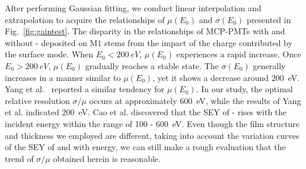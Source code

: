 After performing Gaussian fitting, we conduct linear interpolation and extrapolation to acquire the relationships of $\mu(E_0)$ and $\sigma(E_0)$ presented in Fig.~\ref{fig:gaintest}. The disparity in the relationships of MCP-PMTs with and without - deposited on $\mathrm{M}1$ stems from the impact of the charge contributed by the surface mode. When \(E_0 < \SI{200}{eV}\), $\mu(E_0)$ experiences a rapid increase. Once \(E_0 > \SI{200}{eV}\), $\mu(E_0)$ gradually reaches a stable state. The $\sigma(E_0)$ generally increases in a manner similar to $\mu(E_0)$, yet it shows a decrease around \SI{200}{eV}. Yang et al.~\cite{2017MCP} reported a similar tendency for $\mu(E_0)$. In our study, the optimal relative resolution $\sigma/\mu$ occurs at approximately \SI{600}{eV}, while the results of Yang et al. indicated \SI{200}{eV}. Cao et al.\cite{cao_secondary_2021} discovered that the SEY of - rises with the incident energy within the range of 100 - \SI{600}{eV}. Even though the film structure and thickness we employed are different, taking into account the variation curves of the SEY of  and  with energy, we can still make a rough evaluation that the trend of $\sigma/\mu$ obtained herein is reasonable.
